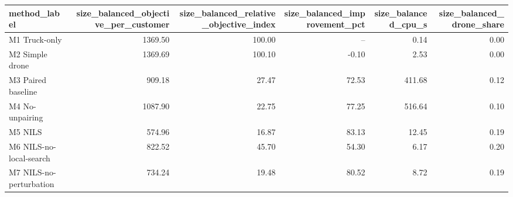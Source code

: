 \begin{tabular}{lrrrrr}
\toprule
method_label & size_balanced_objective_per_customer & size_balanced_relative_objective_index & size_balanced_improvement_pct & size_balanced_cpu_s & size_balanced_drone_share \\
\midrule
M1 Truck-only & 1369.50 & 100.00 & -- & 0.14 & 0.00 \\
M2 Simple drone & 1369.69 & 100.10 & -0.10 & 2.53 & 0.00 \\
M3 Paired baseline & 909.18 & 27.47 & 72.53 & 411.68 & 0.12 \\
M4 No-unpairing & 1087.90 & 22.75 & 77.25 & 516.64 & 0.10 \\
M5 NILS & 574.96 & 16.87 & 83.13 & 12.45 & 0.19 \\
M6 NILS-no-local-search & 822.52 & 45.70 & 54.30 & 6.17 & 0.20 \\
M7 NILS-no-perturbation & 734.24 & 19.48 & 80.52 & 8.72 & 0.19 \\
\bottomrule
\end{tabular}
